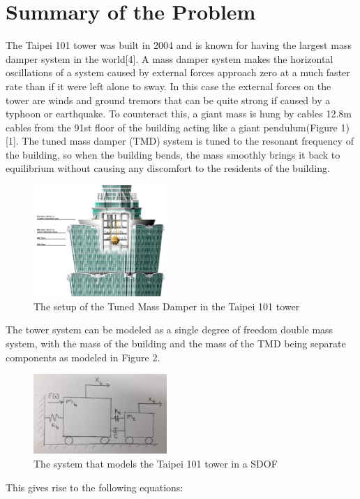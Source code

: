 \documentclass[12pt,twoside,letterpaper]{article}
\begin{document}

\pagestyle{plain}

\newpage
\section*{Summary of the Problem}
The Taipei 101 tower was built in 2004 and is known for having the largest mass damper system in the world[4]. A mass damper system makes the horizontal oscillations of a system caused by external forces approach zero at a much faster rate than if it were left alone to sway. In this case the external forces on the tower are winds and ground tremors that can be quite strong if caused by a typhoon or earthquake. To counteract this, a giant mass is hung by cables 12.8m cables from the 91st floor of the building acting like a giant pendulum(Figure 1)[1]. The tuned mass damper (TMD) system  is tuned to the resonant frequency of the building, so when the building bends, the mass smoothly brings it back to equilibrium without causing any discomfort to the residents of the building.

\begin{figure}[h!]
\centering
\includegraphics[width=0.45\textwidth]{figures/Taipei101.png} 
\caption{The setup of the Tuned Mass Damper in the Taipei 101 tower}
\label{tower}
\end{figure}

The tower system can be modeled as a single degree of freedom double mass system, with the mass of the building and the mass of the TMD being separate components as modeled in Figure 2.  

\begin{figure}[h!]
\centering
\includegraphics[width=0.45\textwidth]{figures/IMG_4477.jpg} 
\caption{The system that models the Taipei 101 tower in a SDOF}
\end{figure}
\newpage
This gives rise to the following equations: 
\end{document}
